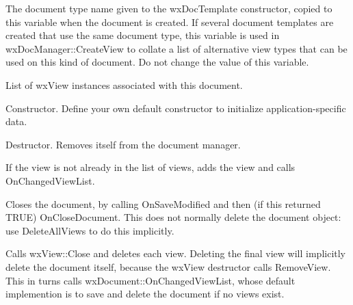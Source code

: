 \label{documenttypename}


The document type name given to the wxDocTemplate constructor, copied to this
variable when the document is created. If several document templates are
created that use the same document type, this variable is used in wxDocManager::CreateView
to collate a list of alternative view types that can be used on this kind of
document. Do not change the value of this variable.



List of wxView instances associated with this document.



Constructor. Define your own default constructor to initialize application-specific
data.



Destructor. Removes itself from the document manager.



If the view is not already in the list of views, adds the view and calls OnChangedViewList.



Closes the document, by calling OnSaveModified and then (if this returned TRUE) OnCloseDocument.
This does not normally delete the document object: use DeleteAllViews to do this implicitly.



Calls wxView::Close and deletes each view. Deleting the final view will implicitly
delete the document itself, because the wxView destructor calls RemoveView. This
in turns calls wxDocument::OnChangedViewList, whose default implemention is to
save and delete the document if no views exist.


